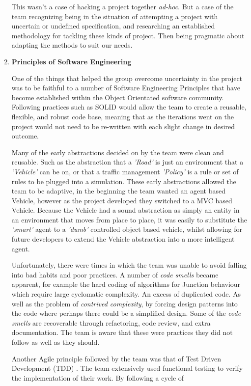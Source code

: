 \documentclass[11pt]{article}
\begin{document}
\begin{enumerate}
	This wasn't a case of hacking a project together \textit{ad-hoc}. But a case of the team recognizing being in the situation of attempting a project with uncertain or undefined specification, and researching an established methodology for tackling these kinds of project. Then being pragmatic about adapting the methods to suit our needs.
	
	\item \textbf{Principles of Software Engineering}
	
	One of the things that helped the group overcome uncertainty in the project was to be faithful to a number of Software Engineering Principles that have become established within the Object Orientated software community. Following practices such as SOLID \cite{website:Principles-of-OOD} would allow the team to create a reusable, flexible, and robust code base, meaning that as the iterations went on the project would not need to be re-written with each slight change in desired outcome.
	
	Many of the early abstractions decided on by the team were clean and reusable. Such as the abstraction that a \textit{'Road'} is just an environment that a \textit{'Vehicle'} can be on, or that a traffic management \textit{'Policy'} is a rule or set of rules to be plugged into a simulation. These early abstractions allowed the team to be adaptive, in the beginning the team wanted an agent based Vehicle, however as the project developed they switched to a MVC based Vehicle. Because the Vehicle had a sound abstraction as simply an entity in an environment that moves from place to place, it was easily to substitute the \textit{'smart'} agent to a \textit{'dumb'} controlled object based vehicle, whilst allowing for future developers to extend the Vehicle abstraction into a more intelligent agent.
	
	Unfortunately, there were times in which the team was unable to avoid falling into bad habits and poor practices. A number of \textit{code smells} became apparent, for example the hard coding of algorithms for Junction behaviour which require large cyclomatic complexity. An excess of duplicated code. As well as the problem of \textit{contrived complexity}, by forcing design patterns into the code where perhaps there could be a simplified design. Some of the \textit{code smells} are recoverable through refactoring, code review, and extra documentation. The team is aware that these were practices they did not follow as well as they should.
	
	Another Agile principle followed by the team was that of Test Driven Development (TDD) \cite{website:Intro-TDD}. The team extensively used functional testing to verify the implementation of their work. By following a cycle of 
	

\end{enumerate}
\end{document}

